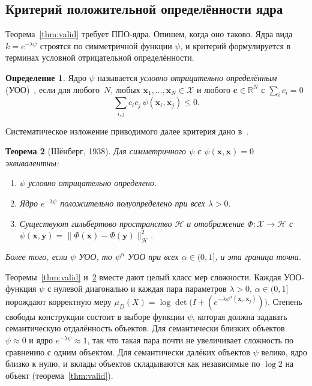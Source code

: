 \documentclass[14pt, a4paper]{extarticle}
\theoremstyle{definition}
\newtheorem{definition}{Определение}[section]
\theoremstyle{plain}
\newtheorem{theorem}[definition]{Теорема}
\begin{document}
\subsection{Критерий положительной определённости ядра}
\label{ssec:cnd}

Теорема~\ref{thm:valid} требует ППО-ядра. Опишем, когда оно таково. Ядра вида
$k=e^{-\lambda\psi}$ строятся по симметричной функции $\psi$, и критерий
формулируется в терминах условной отрицательной определённости.

\begin{definition}
\label{def:cnd}
Ядро $\psi$ называется \emph{условно отрицательно определённым}
(УОО)~\cite[гл.~3]{BergChristensenRessel1984}, если для любого~$N$, любых
$\mathbf{x}_1,\dots,\mathbf{x}_N\in\mathcal{X}$ и любого
$\mathbf{c}\in\mathbb{R}^N$ с $\sum_i c_i=0$
\[
    \sum_{i,j} c_i c_j\,\psi(\mathbf{x}_i,\mathbf{x}_j)\le 0 .
\]
\end{definition}

Систематическое изложение приводимого далее критерия дано
в~\cite[гл.~3]{BergChristensenRessel1984}.

\begin{theorem}[Шёнберг, 1938]
\label{thm:cnd}
Для симметричного $\psi$ с $\psi(\mathbf{x},\mathbf{x})=0$ эквивалентны:
\begin{enumerate}
    \item[\textnormal{(i)}] $\psi$ условно отрицательно определено.
    \item[\textnormal{(ii)}] Ядро $e^{-\lambda\psi}$ положительно полуопределено
          при всех $\lambda>0$.
    \item[\textnormal{(iii)}] Существуют гильбертово пространство $\mathcal{H}$ и
          отображение $\Phi:\mathcal{X}\to\mathcal{H}$ с
          $\psi(\mathbf{x},\mathbf{y})
           =\|\Phi(\mathbf{x})-\Phi(\mathbf{y})\|_{\mathcal{H}}^2$.
\end{enumerate}
Более того, если $\psi$ УОО, то $\psi^\alpha$ УОО при всех $\alpha\in(0,1]$, и эта
граница точна.
\end{theorem}


Теоремы~\ref{thm:valid} и~\ref{thm:cnd} вместе дают целый класс мер сложности.
Каждая УОО-функция $\psi$ с нулевой диагональю и каждая пара параметров
$\lambda>0$, $\alpha\in(0,1]$ порождают корректную меру
$\mu_D(X)=\log\det\big(I+(e^{-\lambda\psi^\alpha(\mathbf{x}_i,\mathbf{x}_j)})\big)$.
Степень свободы конструкции состоит в выборе функции
$\psi$, которая должна задавать семантическую отдалённость объектов. Для
семантически близких объектов $\psi\approx0$ и ядро $e^{-\lambda\psi}\approx1$, так
что такая пара почти не увеличивает сложность по сравнению с одним объектом. Для
семантически далёких объектов $\psi$ велико, ядро близко к нулю, и вклады объектов
складываются как независимые по $\log2$ на объект (теорема~\ref{thm:valid}).
\end{document}
